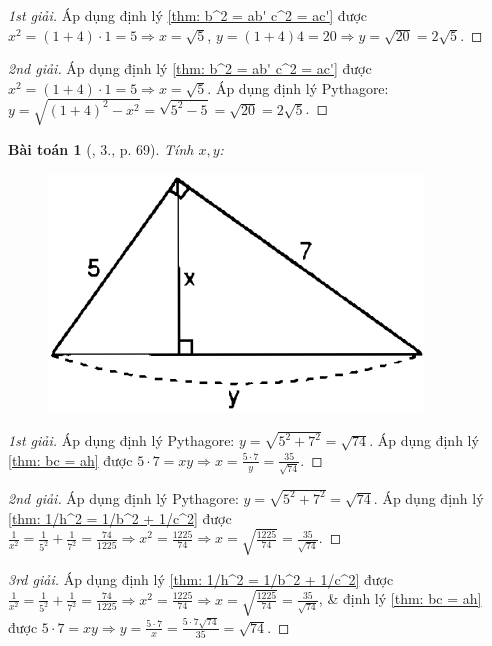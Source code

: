 \documentclass{article}
\newtheorem{baitoan}{Bài toán}
\begin{document}
\begin{proof}[1st giải]
	Áp dụng định lý \ref{thm: b^2 = ab' c^2 = ac'} được $x^2 = (1 + 4)\cdot1 = 5\Rightarrow x = \sqrt{5}$, $y = (1 + 4)4 = 20\Rightarrow y = \sqrt{20} = 2\sqrt{5}$.
\end{proof}

\begin{proof}[2nd giải]
	Áp dụng định lý \ref{thm: b^2 = ab' c^2 = ac'} được $x^2 = (1 + 4)\cdot1 = 5\Rightarrow x = \sqrt{5}$. Áp dụng định lý Pythagore: $y = \sqrt{(1 + 4)^2 - x^2} = \sqrt{5^2 - 5} = \sqrt{20} = 2\sqrt{5}$.
\end{proof}

\begin{baitoan}[\cite{SGK_Toan_9_tap_1}, 3., p. 69]
	Tính $x,y$:
	\begin{figure}[H]
		\centering
		\includegraphics[scale=.25]{SGK_Toan_9_6_p69}
	\end{figure}
\end{baitoan}

\begin{proof}[1st giải]
	Áp dụng định lý Pythagore: $y = \sqrt{5^2 + 7^2} = \sqrt{74}$. Áp dụng định lý \ref{thm: bc = ah} được $5\cdot7 = xy\Rightarrow x = \frac{5\cdot7}{y} = \frac{35}{\sqrt{74}}$.
\end{proof}

\begin{proof}[2nd giải]
	Áp dụng định lý Pythagore: $y = \sqrt{5^2 + 7^2} = \sqrt{74}$. Áp dụng định lý \ref{thm: 1/h^2 = 1/b^2 + 1/c^2} được $\frac{1}{x^2} = \frac{1}{5^2} + \frac{1}{7^2} = \frac{74}{1225}\Rightarrow x^2 = \frac{1225}{74}\Rightarrow x = \sqrt{\frac{1225}{74}} = \frac{35}{\sqrt{74}}$.
\end{proof}

\begin{proof}[3rd giải]
	Áp dụng định lý \ref{thm: 1/h^2 = 1/b^2 + 1/c^2} được $\frac{1}{x^2} = \frac{1}{5^2} + \frac{1}{7^2} = \frac{74}{1225}\Rightarrow x^2 = \frac{1225}{74}\Rightarrow x = \sqrt{\frac{1225}{74}} = \frac{35}{\sqrt{74}}$, \& định lý \ref{thm: bc = ah} được $5\cdot7 = xy\Rightarrow y = \frac{5\cdot7}{x} = \frac{5\cdot7\sqrt{74}}{35} = \sqrt{74}$.
\end{proof}
\end{document}
